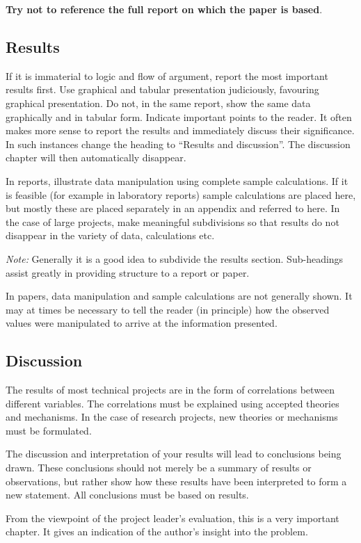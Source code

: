 \documentclass[a5paper, 10pt]{article}
\begin{document}
\textbf{Try not to reference the full report on which the paper is based}.

\subsection{Results}
\label{sec:results}
If it is immaterial to logic and flow of argument, report the most
important results first.  Use graphical and tabular presentation
judiciously, favouring graphical presentation.  Do not, in the same
report, show the same data graphically and in tabular form.  Indicate
important points to the reader.  It often makes more sense to report
the results and immediately discuss their significance.  In such
instances change the heading to ``Results and discussion''. The
discussion chapter will then automatically disappear.

In reports, illustrate data manipulation using complete sample
calculations.  If it is feasible (for example in laboratory reports)
sample calculations are placed here, but mostly these are placed
separately in an appendix and referred to here.  In the case of large
projects, make meaningful subdivisions so that results do not
disappear in the variety of data, calculations etc.

\emph{Note:} Generally it is a good idea to subdivide the results section.
Sub-headings assist greatly in providing structure to a report or
paper.

In papers, data manipulation and sample calculations are not generally
shown.  It may at times be necessary to tell the reader (in principle)
how the observed values were manipulated to arrive at the information
presented.

\subsection{Discussion}
\label{sec:discussion}
The results of most technical projects are in the form of correlations
between different variables.  The correlations must be explained using
accepted theories and mechanisms.  In the case of research projects,
new theories or mechanisms must be formulated.

The discussion and interpretation of your results will lead to
conclusions being drawn.  These conclusions should not merely be a
summary of results or observations, but rather show how these results
have been interpreted to form a new statement.
All conclusions must be based on results.

From the viewpoint of the project leader's evaluation, this is a very
important chapter.  It gives an indication of the author's insight
into the problem.
\end{document}
